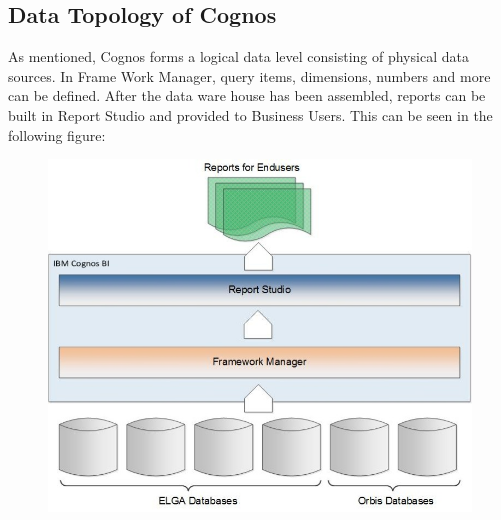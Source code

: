 \documentclass[a4paper]{article}
\begin{document}
	\subsection{Data Topology of Cognos}
	As mentioned, Cognos forms a logical data level consisting of
	physical data sources. In Frame Work Manager, query items, dimensions, numbers
	and more can be defined. After the data ware house has been assembled, reports
	can be built in Report Studio and provided to Business Users. This can be seen
	in the following figure:
	\begin{figure}[!ht]
		  \centering
		      \includegraphics[width=1.0\textwidth]{AllDBtoCognos}
		  \caption{}
	\end{figure}
	
	\newpage
		
\end{document}
